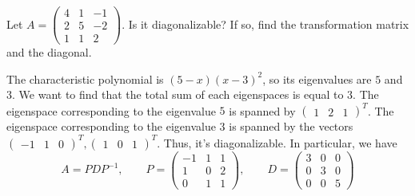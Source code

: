 \begin{exercise}
Let $A=
\begin{pmatrix}
4 & 1 & -1\\
2 & 5 & -2\\
1 & 1 & 2
\end{pmatrix}$. Is it diagonalizable? If so, find the transformation 
matrix and the diagonal.
\end{exercise}
\begin{solution}
The characteristic polynomial is $(5 - x)(x - 3)^2$, so its eigenvalues 
are $5$ and $3$. We want to find that the total sum of each eigenspaces 
is equal to $3$. The eigenspace corresponding to the eigenvalue $5$ is 
spanned by $\begin{pmatrix}
    1 & 2 & 1
\end{pmatrix}^T$. The eigenspace corresponding to the eigenvalue $3$ is 
spanned by the vectors $\begin{pmatrix}
    -1 & 1 & 0
\end{pmatrix}^T, \begin{pmatrix}
    1 & 0 & 1
\end{pmatrix}^T$. Thus, it's diagonalizable. In particular, we have
\[
A = PDP^{-1}, \qquad P = \begin{pmatrix}
    -1 & 1 & 1 \\
    1 & 0 & 2 \\
    0 & 1 & 1
\end{pmatrix}, \qquad D = \begin{pmatrix}
    3 & 0 & 0 \\
    0 & 3 & 0 \\
    0 & 0 & 5
\end{pmatrix}
\]
\end{solution}


